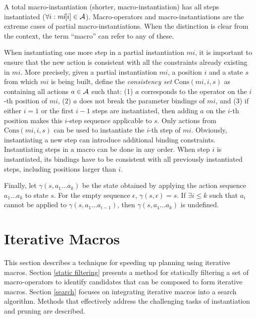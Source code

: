 \documentclass{article}
\begin{document}
A total macro-instantiation (shorter, macro-instantiation) has
all steps instantiated 
($\forall i : \textit{mi}[i] \in {\cal{A}}$).
Macro-operators and macro-instantiations are the extreme cases 
of partial macro-instantiations.
When the distinction is clear from the context, the term ``macro'' can refer
to any of these.

When instantiating one more step in a partial instantiation $\textit{mi}$,
it is important to ensure that the new action is consistent
with all the constraints already existing in $\textit{mi}$.
More precisely, 
given a partial instantiation $\textit{mi}$, a position $i$ and a state $s$
from which $\textit{mi}$ is being built,
define the \emph{consistency set} $\mbox{Cons}(\textit{mi}, i, s)$
as containing all actions $a \in {\cal{A}}$ such that:
(1) $a$ corresponds to the operator on the $i$-th position of $\textit{mi}$,
(2) $a$ does not break the parameter bindings of $\textit{mi}$, and
(3) if either $i=1$ or the first $i-1$ steps are instantiated, then adding $a$ on the $i$-th
position makes this $i$-step sequence applicable to $s$.
Only actions from $\mbox{Cons}(\textit{mi}, i, s)$ can be used to instantiate
the $i$-th step of $\textit{mi}$. 
Obviously, instantiating a new step can introduce additional binding constraints.
Instantiating steps in a macro can be done in any order. When step $i$ is instantiated,
its bindings have to be consistent with all previously instantiated steps, including positions
larger than $i$.

Finally, let $\gamma(s, a_1 \dots a_k)$ be the state obtained by 
applying the action sequence $a_1 \dots a_k$ to state $s$.
For the empty sequence $\epsilon$, $\gamma(s, \epsilon) = s$.
If $\exists i \leq k$ such that $a_i$ cannot be applied to
$\gamma(s, a_1 \dots a_{i-1})$, then $\gamma(s, a_1 \dots a_k)$ is undefined.

\section{Iterative Macros}
\label{iterative macros}

This section describes a technique for speeding up planning
using iterative macros.
Section \ref{static filtering} presents a method for
statically filtering a set of macro-operators to identify candidates
that can be composed to form iterative macros.
Section \ref{search}  focuses on integrating iterative macros into a search algorithm.
Methods that effectively address the challenging tasks of instantiation and pruning
are described.
\end{document}
